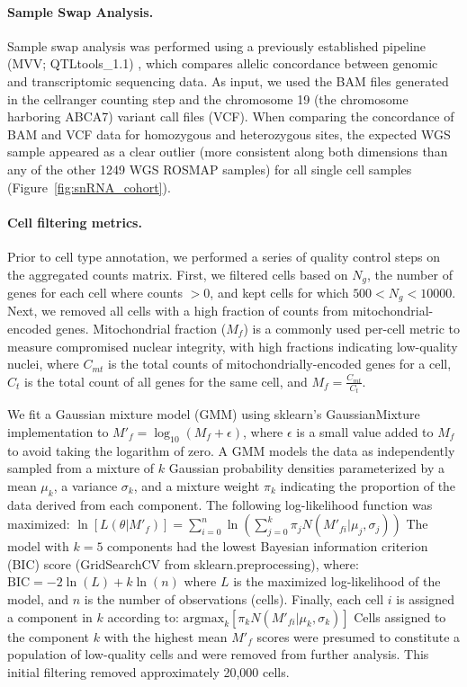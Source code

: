 \paragraph{Sample Swap Analysis.}
Sample swap analysis was performed using a previously established pipeline (MVV; QTLtools\_1.1) \cite{Fort2017-jq}, which compares allelic concordance between genomic and transcriptomic sequencing data. As input, we used the BAM files generated in the cellranger counting step and the chromosome 19 (the chromosome harboring ABCA7) variant call files (VCF). When comparing the concordance of BAM and VCF data for homozygous and heterozygous sites, the expected WGS sample appeared as a clear outlier (more consistent along both dimensions than any of the other 1249 WGS ROSMAP samples) for all single cell samples (Figure~\ref{fig:snRNA_cohort}).


\paragraph{Cell filtering metrics.}
Prior to cell type annotation, we performed a series of quality control steps on the aggregated counts matrix. First, we filtered cells based on $N_g$, the number of genes for each cell where counts $>0$, and kept cells for which $500 < N_g < 10000$. Next, we removed all cells with a high fraction of counts from mitochondrial-encoded genes. Mitochondrial fraction ($M_f$) is a commonly used per-cell metric to measure compromised nuclear integrity, with high fractions indicating low-quality nuclei, where $C_{mt}$ is the total counts of mitochondrially-encoded genes for a cell, $C_t$ is the total count of all genes for the same cell, and $M_f = \frac{C_{mt}}{C_t}$.

We fit a Gaussian mixture model (GMM) using sklearn's GaussianMixture implementation to $M'_f = \log_{10}(M_f + \epsilon)$, where $\epsilon$ is a small value added to $M_f$ to avoid taking the logarithm of zero. A GMM models the data as independently sampled from a mixture of $k$ Gaussian probability densities parameterized by a mean $\mu_k$, a variance $\sigma_k$, and a mixture weight $\pi_k$ indicating the proportion of the data derived from each component. The following log-likelihood function was maximized:
$ \ln[L(\theta|M'_f)] = \sum_{i=0}^{n} \ln \left( \sum_{j=0}^{k} \pi_j N(M'_{fi}|\mu_j, \sigma_j) \right) $
The model with $k = 5$ components had the lowest Bayesian information criterion (BIC) score (GridSearchCV from sklearn.preprocessing), where:
$ \text{BIC} = -2 \ln(L) + k \ln(n) $
where $L$ is the maximized log-likelihood of the model, and $n$ is the number of observations (cells). Finally, each cell $i$ is assigned a component in $k$ according to:
$ \text{argmax}_k \left[ \pi_k N(M'_{fi}|\mu_k, \sigma_k) \right] $
Cells assigned to the component $k$ with the highest mean $M'_f$ scores were presumed to constitute a population of low-quality cells and were removed from further analysis. This initial filtering removed approximately 20,000 cells.

